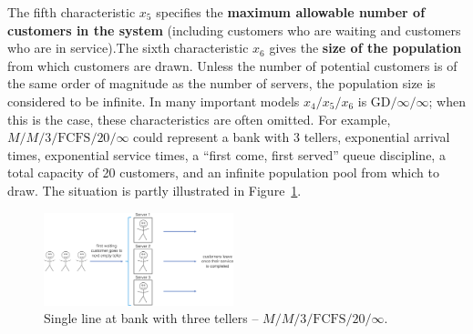 \newl
The fifth characteristic $x_5$ specifies the \textbf{maximum allowable number of customers in the system} (including customers who are waiting and customers who are in service).\newl The sixth characteristic $x_6$ gives the \textbf{size of the population} from which customers are drawn. Unless the number of potential customers is of the same order of magnitude as the number of servers, the population size is considered to be infinite. \newl In many important models $x_4/x_5/x_6$ is $\textrm{GD}/\infty/\infty$; when this is the case, these characteristics are often omitted.  For example, $M/M/3/\textrm{FCFS}/20/\infty$ could represent a bank with 3 tellers, exponential arrival times, exponential service times, a ``first come, first served'' queue discipline, a total capacity of 20 customers, and an infinite population pool from which to draw. The situation is partly illustrated in Figure~\ref{fig:1}.
\begin{figure}[t]
	\centering
		\includegraphics[width=0.49\textwidth]{Images/fig1Queue.png}
	\caption[\small Single line at bank with $3$ tellers]{\small Single line at bank with three tellers -- $M/M/3/\textrm{FCFS}/20/\infty$.}
	\label{fig:1}
\end{figure}
